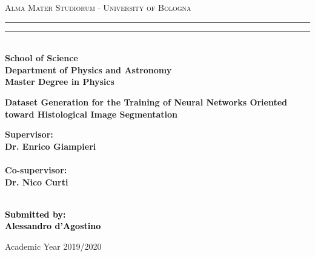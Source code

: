 \documentclass[12pt,a4paper]{report}
\begin{document}
    \begin{titlepage}
    \begin{center}
        {{\Large{\textsc{Alma Mater Studiorum $\cdot$ University of  Bologna}}}}
        \rule[0.1cm]{15.8cm}{0.1mm}
        \rule[0.5cm]{15.8cm}{0.6mm}
        \\\vspace{3mm}
        {\small{\bf School of Science \\
        Department of Physics and Astronomy\\
        Master Degree in Physics}}
    \end{center}

    \vspace{23mm}

    \begin{center}
        \LARGE{\bf Dataset Generation for the Training of Neural Networks Oriented toward Histological Image Segmentation}\\
    \end{center}

    \vspace{40mm} \par \noindent

    \begin{minipage}[t]{0.47\textwidth}
        {\large{\bf Supervisor: \vspace{2mm}\\
        Dr. Enrico Giampieri\\\\
        \bf Co-supervisor: \vspace{2mm}\\
        Dr. Nico Curti\\\\}}
    \end{minipage}

    \hfill
    \begin{minipage}[t]{0.47\textwidth}\raggedleft
        \textcolor{black}{
            {\large{\bf Submitted by:
                \vspace{2mm}\\
                {Alessandro d'Agostino}}}
        }
    \end{minipage}

    \vspace{21mm}

    \begin{center}
        Academic Year 2019/2020
    \end{center}
\end{titlepage}
\end{document}
